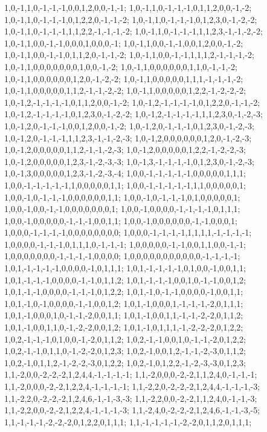 {{1,0,-1,1,0,-1,-1,-1,0,0,1,2,0,0,-1,-1; 1,0,-1,1,0,-1,-1,-1,0,1,1,2,0,0,-1,-2; 1,0,-1,1,0,-1,-1,-1,0,1,2,2,0,-1,-1,-2; 1,0,-1,1,0,-1,-1,-1,0,1,2,3,0,-1,-2,-2; 1,0,-1,1,0,-1,-1,-1,1,1,2,2,-1,-1,-1,-2; 1,0,-1,1,0,-1,-1,-1,1,1,2,3,-1,-1,-2,-2; 1,0,-1,1,0,0,-1,-1,0,0,0,1,0,0,0,-1; 1,0,-1,1,0,0,-1,-1,0,0,1,2,0,0,-1,-2; 1,0,-1,1,0,0,-1,-1,0,1,1,2,0,-1,-1,-2; 1,0,-1,1,0,0,-1,-1,1,1,1,2,-1,-1,-1,-2; 1,0,-1,1,0,0,0,0,0,0,0,1,0,0,-1,-2; 1,0,-1,1,0,0,0,0,0,0,1,1,0,-1,-1,-2;
1,0,-1,1,0,0,0,0,0,0,1,2,0,-1,-2,-2; 1,0,-1,1,0,0,0,0,0,1,1,1,-1,-1,-1,-2; 1,0,-1,1,0,0,0,0,0,1,1,2,-1,-1,-2,-2; 1,0,-1,1,0,0,0,0,0,1,2,2,-1,-2,-2,-2; 1,0,-1,2,-1,-1,-1,-1,0,1,1,2,0,0,-1,-2; 1,0,-1,2,-1,-1,-1,-1,0,1,2,2,0,-1,-1,-2; 1,0,-1,2,-1,-1,-1,-1,0,1,2,3,0,-1,-2,-2; 1,0,-1,2,-1,-1,-1,-1,1,1,2,3,0,-1,-2,-3; 1,0,-1,2,0,-1,-1,-1,0,0,1,2,0,0,-1,-2; 1,0,-1,2,0,-1,-1,-1,0,1,2,3,0,-1,-2,-3; 1,0,-1,2,0,-1,-1,-1,1,1,2,3,-1,-1,-2,-3; 1,0,-1,2,0,0,0,0,0,0,1,2,0,-1,-2,-3;
1,0,-1,2,0,0,0,0,0,1,1,2,-1,-1,-2,-3; 1,0,-1,2,0,0,0,0,0,1,2,2,-1,-2,-2,-3; 1,0,-1,2,0,0,0,0,0,1,2,3,-1,-2,-3,-3; 1,0,-1,3,-1,-1,-1,-1,0,1,2,3,0,-1,-2,-3; 1,0,-1,3,0,0,0,0,0,1,2,3,-1,-2,-3,-4; 1,0,0,-1,-1,-1,-1,-1,0,0,0,0,0,1,1,1; 1,0,0,-1,-1,-1,-1,-1,1,0,0,0,0,0,1,1; 1,0,0,-1,-1,-1,-1,-1,1,1,0,0,0,0,0,1; 1,0,0,-1,0,-1,-1,-1,0,0,0,0,0,0,1,1; 1,0,0,-1,0,-1,-1,-1,0,1,0,0,0,0,0,1; 1,0,0,-1,0,0,-1,-1,0,0,0,0,0,0,0,1; 1,0,0,-1,0,0,0,0,-1,-1,-1,-1,0,1,1,1;
1,0,0,-1,0,0,0,0,0,-1,-1,-1,0,0,1,1; 1,0,0,-1,0,0,0,0,0,0,-1,-1,0,0,0,1; 1,0,0,0,-1,-1,-1,-1,0,0,0,0,0,0,0,0; 1,0,0,0,-1,-1,-1,-1,1,1,1,1,-1,-1,-1,-1; 1,0,0,0,0,-1,-1,-1,0,1,1,1,0,-1,-1,-1; 1,0,0,0,0,0,-1,-1,0,0,1,1,0,0,-1,-1; 1,0,0,0,0,0,0,0,-1,-1,-1,-1,0,0,0,0; 1,0,0,0,0,0,0,0,0,0,0,0,-1,-1,-1,-1; 1,0,1,-1,-1,-1,-1,0,0,0,0,-1,0,1,1,1; 1,0,1,-1,-1,-1,-1,0,1,0,0,-1,0,0,1,1; 1,0,1,-1,-1,-1,0,0,0,0,-1,-1,0,1,1,2; 1,0,1,-1,-1,-1,0,0,1,0,-1,-1,0,0,1,2;
1,0,1,-1,-1,0,0,0,0,-1,-1,-1,0,1,2,2; 1,0,1,-1,0,-1,-1,0,0,0,0,-1,0,0,1,1; 1,0,1,-1,0,-1,0,0,0,0,-1,-1,0,0,1,2; 1,0,1,-1,0,0,0,1,-1,-1,-1,-2,0,1,1,1; 1,0,1,-1,0,0,0,1,0,-1,-1,-2,0,0,1,1; 1,0,1,-1,0,0,1,1,-1,-1,-2,-2,0,1,1,2; 1,0,1,-1,0,0,1,1,0,-1,-2,-2,0,0,1,2; 1,0,1,-1,0,1,1,1,-1,-2,-2,-2,0,1,2,2; 1,0,2,-1,-1,-1,0,1,0,0,-1,-2,0,1,1,2; 1,0,2,-1,-1,0,0,1,0,-1,-1,-2,0,1,2,2; 1,0,2,-1,-1,0,1,1,0,-1,-2,-2,0,1,2,3; 1,0,2,-1,0,0,1,2,-1,-1,-2,-3,0,1,1,2;
1,0,2,-1,0,1,1,2,-1,-2,-2,-3,0,1,2,2; 1,0,2,-1,0,1,2,2,-1,-2,-3,-3,0,1,2,3; 1,1,-2,0,0,-2,-2,-2,1,2,4,4,-1,-1,-1,-1; 1,1,-2,0,0,0,-2,-2,1,1,2,4,0,-1,-1,-1; 1,1,-2,0,0,0,-2,-2,1,2,2,4,-1,-1,-1,-1; 1,1,-2,2,0,-2,-2,-2,1,2,4,4,-1,-1,-1,-3; 1,1,-2,2,0,-2,-2,-2,1,2,4,6,-1,-1,-3,-3; 1,1,-2,2,0,0,-2,-2,1,1,2,4,0,-1,-1,-3; 1,1,-2,2,0,0,-2,-2,1,2,2,4,-1,-1,-1,-3; 1,1,-2,4,0,-2,-2,-2,1,2,4,6,-1,-1,-3,-5; 1,1,-1,-1,-1,-2,-2,-2,0,1,2,2,0,1,1,1; 1,1,-1,-1,-1,-1,-2,-2,0,1,1,2,0,1,1,1;
}}
